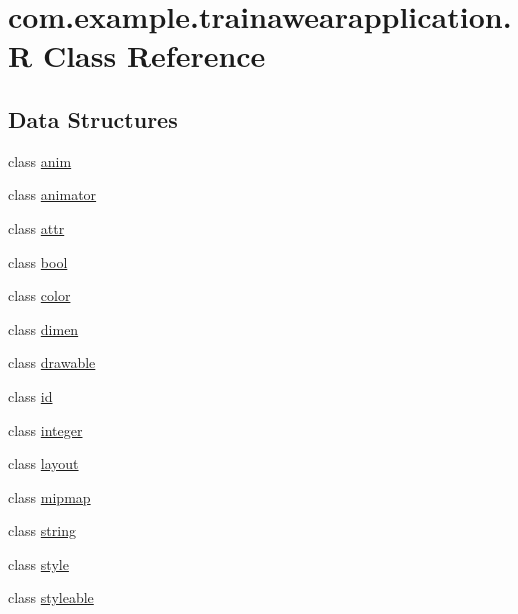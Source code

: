 \hypertarget{classcom_1_1example_1_1trainawearapplication_1_1_r}{}\section{com.\+example.\+trainawearapplication.\+R Class Reference}
\label{classcom_1_1example_1_1trainawearapplication_1_1_r}
\subsection*{Data Structures}
\begin{DoxyCompactItemize}
\item 
class \mbox{\hyperlink{classcom_1_1example_1_1trainawearapplication_1_1_r_1_1anim}{anim}}
\item 
class \mbox{\hyperlink{classcom_1_1example_1_1trainawearapplication_1_1_r_1_1animator}{animator}}
\item 
class \mbox{\hyperlink{classcom_1_1example_1_1trainawearapplication_1_1_r_1_1attr}{attr}}
\item 
class \mbox{\hyperlink{classcom_1_1example_1_1trainawearapplication_1_1_r_1_1bool}{bool}}
\item 
class \mbox{\hyperlink{classcom_1_1example_1_1trainawearapplication_1_1_r_1_1color}{color}}
\item 
class \mbox{\hyperlink{classcom_1_1example_1_1trainawearapplication_1_1_r_1_1dimen}{dimen}}
\item 
class \mbox{\hyperlink{classcom_1_1example_1_1trainawearapplication_1_1_r_1_1drawable}{drawable}}
\item 
class \mbox{\hyperlink{classcom_1_1example_1_1trainawearapplication_1_1_r_1_1id}{id}}
\item 
class \mbox{\hyperlink{classcom_1_1example_1_1trainawearapplication_1_1_r_1_1integer}{integer}}
\item 
class \mbox{\hyperlink{classcom_1_1example_1_1trainawearapplication_1_1_r_1_1layout}{layout}}
\item 
class \mbox{\hyperlink{classcom_1_1example_1_1trainawearapplication_1_1_r_1_1mipmap}{mipmap}}
\item 
class \mbox{\hyperlink{classcom_1_1example_1_1trainawearapplication_1_1_r_1_1string}{string}}
\item 
class \mbox{\hyperlink{classcom_1_1example_1_1trainawearapplication_1_1_r_1_1style}{style}}
\item 
class \mbox{\hyperlink{classcom_1_1example_1_1trainawearapplication_1_1_r_1_1styleable}{styleable}}
\end{DoxyCompactItemize}


